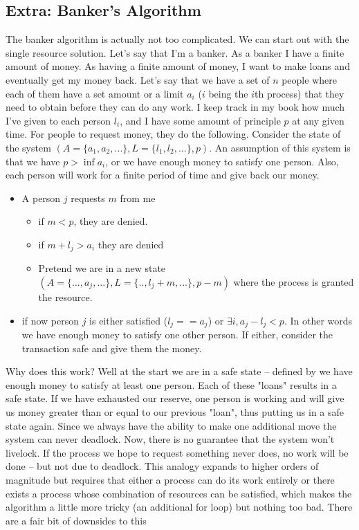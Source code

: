 \subsection{Extra: Banker's Algorithm}

The banker algorithm is actually not too complicated. We can start out with the single resource solution. Let's say that I'm a banker. As a banker I have a finite amount of money. As having a finite amount of money, I want to make loans and eventually get my money back. Let's say that we have a set of $n$ people where each of them have a set amount or a limit $a_i$ ($i$ being the $i$th process) that they need to obtain before they can do any work. I keep track in my book how much I've given to each person $l_i$, and I have some amount of principle $p$ at any given time. For people to request money, they do the following. Consider the state of the system $(A=\{a_1, a_2, ...\}, L=\{l_1, l_2, ...\}, p)$. An assumption of this system is that we have $p > \inf a_i$, or we have enough money to satisfy one person. Also, each person will work for a finite period of time and give back our money.

\begin{itemize}
\item A person $j$ requests $m$ from me
\begin{itemize}
\item if $m < p$, they are denied.
\item if $m + l_j > a_i$ they are denied
\item Pretend we are in a new state $(A=\{..., a_j, ...\}, L=\{.., l_j + m, ...\}, p - m)$ where the process is granted the resource.
\end{itemize}
\item if now person $j$ is either satisfied ($l_j == a_j$) or $\exists i, a_j - l_j < p$. In other words we have enough money to satisfy one other person. If either, consider the transaction safe and give them the money.
\end{itemize}

Why does this work? Well at the start we are in a safe state -- defined by we have enough money to satisfy at least one person. Each of these "loans" results in a safe state. If we have exhausted our reserve, one person is working and will give us money greater than or equal to our previous "loan", thus putting us in a safe state again. Since we always have the ability to make one additional move the system can never deadlock. Now, there is no guarantee that the system won't livelock. If the process we hope to request something never does, no work will be done -- but not due to deadlock. This analogy expands to higher orders of magnitude but requires that either a process can do its work entirely or there exists a process whose combination of resources can be satisfied, which makes the algorithm a little more tricky (an additional for loop) but nothing too bad. There are a fair bit of downsides to this

